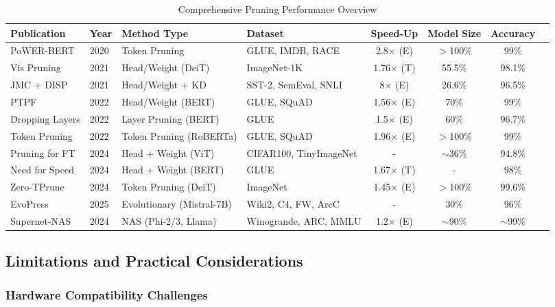 \begin{table}[H]
	\begin{adjustwidth}{-2cm}{0cm} 
		\centering
		\tiny
		\caption{Comprehensive Pruning Performance Overview}
		\label{tab:comprehensive_pruning}
		\begin{tabular}{@{}lllp{4.5cm}cccc@{}}
			\toprule
			\textbf{Publication} & \textbf{Year} & \textbf{Method Type} & \textbf{Dataset} & \textbf{Speed-Up} & \textbf{Model Size} & \textbf{Accuracy} \\ \midrule
			PoWER-BERT & 2020 & Token Pruning & GLUE, IMDB, RACE & 2.8$\times$ (E) & $>$100\% & 99\% \\
			Vis Pruning & 2021 & Head/Weight (DeiT) & ImageNet-1K & 1.76$\times$ (T) & 55.5\% & 98.1\% \\
			JMC + DISP & 2021 & Head/Weight + KD & SST-2, SemEval, SNLI & 8$\times$ (E) & 26.6\% & 96.5\% \\
			PTPF & 2022 & Head/Weight (BERT) & GLUE, SQuAD & 1.56$\times$ (E) & 70\% & 99\% \\
			Dropping Layers & 2022 & Layer Pruning (BERT) & GLUE & 1.5$\times$ (E) & 60\% & 96.7\% \\
			Token Pruning & 2022 & Token Pruning (RoBERTa) & GLUE, SQuAD & 1.96$\times$ (E) & $>$100\% & 99\% \\
			Pruning for FT & 2024 & Head + Weight (ViT) & CIFAR100, TinyImageNet & - & $\sim$36\% & 94.8\% \\
			Need for Speed & 2024 & Head + Weight (BERT) & GLUE & 1.67$\times$ (T) & - & 98\% \\
			Zero-TPrune & 2024 & Token Pruning (DeiT) & ImageNet & 1.45$\times$ (E) & $>$100\% & 99.6\% \\
			EvoPress & 2025 & Evolutionary (Mistral-7B) & Wiki2, C4, FW, ArcC & - & 30\% & 96\% \\
			Supernet-NAS & 2024 & NAS (Phi-2/3, Llama) & Winogrande, ARC, MMLU & 1.2$\times$ (E) & $\sim$90\% & $\sim$99\% \\
			\bottomrule
		\end{tabular}
	\end{adjustwidth}
\end{table}

\subsection{Limitations and Practical Considerations}

\subsubsection{Hardware Compatibility Challenges}


